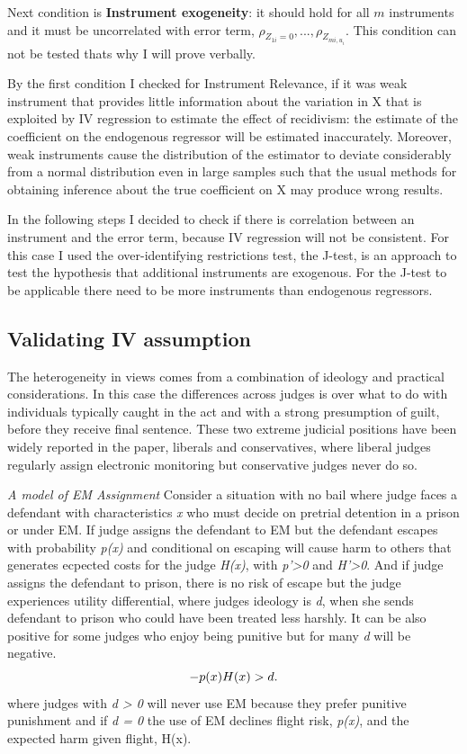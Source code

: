 \documentclass[a4paper,12pt]{article}
\begin{document}
Next condition is \textbf{Instrument exogeneity}: it should hold for all $m$ instruments  and it must be uncorrelated with error term, $\rho_{Z_{1i} = 0} ,..., \rho_{Z_{mi,u_i}}$. This condition can not be tested thats why I will prove verbally. 




By the first condition I checked for Instrument Relevance, if it was weak instrument that provides little information about the variation in X that is exploited by IV regression to estimate the effect of recidivism: the estimate of the coefficient on the endogenous regressor will be  estimated inaccurately. Moreover, weak instruments cause the distribution of the estimator to deviate considerably from a normal distribution even in large samples such that the usual methods for obtaining inference about the true coefficient on  X may produce wrong results. 

In the following steps I decided to check if there is correlation between an instrument and the error term, because  IV regression will not be consistent.  For this case I used the over-identifying restrictions test, the J-test, is an approach to test the hypothesis that additional instruments are exogenous. For the J-test to be applicable there need to be more instruments than endogenous regressors.


\subsection{Validating IV assumption}
The heterogeneity in views comes from a combination of ideology and practical considerations. In this case the differences across judges is over what to do with individuals typically caught in the act and with a strong presumption of guilt, before they receive final sentence. These two extreme judicial positions have been widely reported in the paper, liberals and conservatives, where liberal judges regularly assign electronic monitoring but conservative judges never do so. 

\textit{A model of EM Assignment}
Consider a situation with no bail where judge faces a defendant with characteristics \textit{x} who must decide on pretrial detention in a prison or under EM. If judge assigns the defendant to EM but the defendant escapes with probability \textit{p(x)} and conditional on escaping will cause harm to others that generates ecpected costs for the judge \textit{H(x)}, with \textit{p'>0} and \textit{H'>0}. And if judge assigns the defendant to prison, there is no risk of escape but the judge experiences utility differential, where judges ideology is \textit{d}, when she sends defendant to prison who could have been treated less harshly. It can be also positive for some judges who enjoy being punitive but for many \textit{d} will be negative. 
\begin{equation}
    \centering
    - p(x)H(x) > d.
\end{equation}
where judges with \textit{d > 0} will never use EM because they prefer punitive punishment and if \textit{d = 0} the use of EM declines flight risk, \textit{p(x)}, and the expected harm given flight, H(x).  
\end{document}
